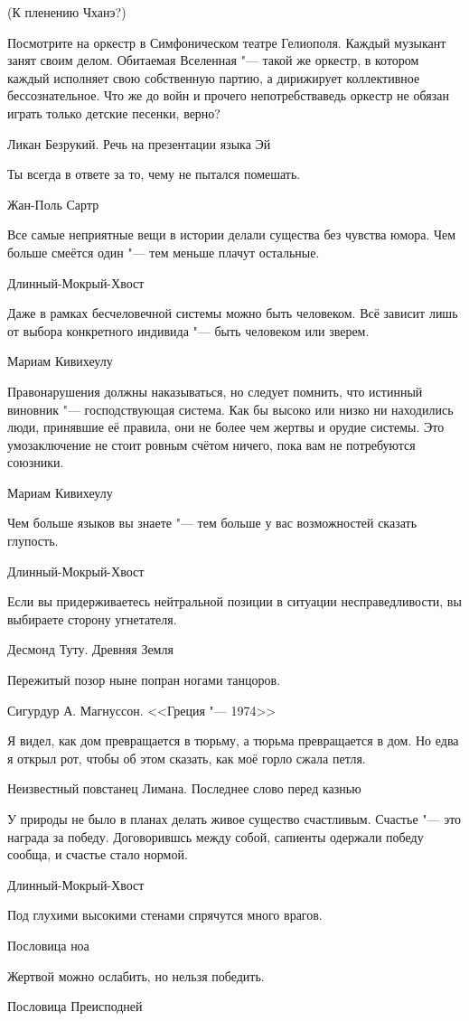 (К пленению Чханэ?)

\epigraph
{Посмотрите на оркестр в Симфоническом театре Гелиополя.
Каждый музыкант занят своим делом.
Обитаемая Вселенная "--- такой же оркестр, в котором каждый исполняет свою собственную партию, а дирижирует коллективное бессознательное.
Что же до войн и прочего непотребства\ldotst ведь оркестр не обязан играть только детские песенки, верно?}
{Ликан Безрукий.
Речь на презентации языка Эй}

\epigraph
{Ты всегда в ответе за то, чему не пытался помешать.}
{Жан-Поль Сартр}

\epigraph
{Все самые неприятные вещи в истории делали существа без чувства юмора.
Чем больше смеётся один "--- тем меньше плачут остальные.}
{Длинный-Мокрый-Хвост}

\epigraph
{Даже в рамках бесчеловечной системы можно быть человеком.
Всё зависит лишь от выбора конкретного индивида "--- быть человеком или зверем.}
{Мариам Кивихеулу}

\epigraph
{Правонарушения должны наказываться, но следует помнить, что истинный виновник "--- господствующая система.
Как бы высоко или низко ни находились люди, принявшие её правила, они не более чем жертвы и орудие системы.
Это умозаключение не стоит ровным счётом ничего, пока вам не потребуются союзники.}
{Мариам Кивихеулу}

\epigraph
{Чем больше языков вы знаете "--- тем больше у вас возможностей сказать глупость.}
{Длинный-Мокрый-Хвост}

\epigraph
{Если вы придерживаетесь нейтральной позиции в ситуации несправедливости, вы выбираете сторону угнетателя.}
{Десмонд Туту. Древняя Земля}

\epigraph
{Пережитый позор ныне попран ногами танцоров.}
{Сигурдур А. Магнуссон. <<Греция "--- 1974>>}

\epigraph
{Я видел, как дом превращается в тюрьму, а тюрьма превращается в дом.
Но едва я открыл рот, чтобы об этом сказать, как моё горло сжала петля.}
{Неизвестный повстанец Лимана.
Последнее слово перед казнью}

\epigraph{У природы не было в планах делать живое существо счастливым.
Счастье "--- это награда за победу.
Договорившсь между собой, сапиенты одержали победу сообща, и счастье стало нормой.}
{Длинный-Мокрый-Хвост}

\epigraph{Под глухими высокими стенами спрячутся много врагов.}
{Пословица ноа}

\epigraph
{Жертвой можно ослабить, но нельзя победить.}
{Пословица Преисподней}

